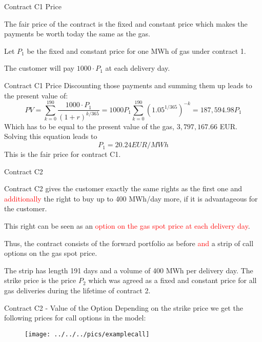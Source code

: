 {Contract C1 Price}






	The fair price of the contract is the fixed and constant price which makes the payments be worth today the same as the gas.


	Let $P_1$ be the fixed and constant price for one MWh of gas under contract 1.


	The customer will pay $1000 \cdot P_1$ at each delivery day.





{Contract C1 Price}
Discounting those payments and summing them up leads to the present value of:
$$
	PV = \sum_{k=0}^{190}{\frac{1000 \cdot P_1}{(1 + r)^{k/365}}} = 1000 P_1 \sum_{k=0}^{190} (1.05^{1/365})^{-k} = 187,594.98 P_1
$$
Which has to be equal to the present value of the gas, $3,797,167.66$ EUR. Solving this equation leads to
$$
	P_1 = 20.24 EUR/MWh
$$
This is the fair price for contract C1.


{Contract C2}






	Contract C2 gives the customer exactly the same rights as the first one and \textcolor{red}{additionally} the right to buy up to 400 MWh/day more, if it is advantageous for the customer.


	This right can be seen as an \textcolor{red}{option on the gas spot price at each delivery day}.


	Thus, the contract consists of the forward portfolio as before \textcolor{red}{and} a strip of call options on the gas spot price.


	The strip has length 191 days and a volume of 400 MWh per delivery day. The strike price is the price $P_2$ which was agreed as a fixed and constant price for all gas deliveries during the lifetime of contract 2.





{Contract C2 - Value of the Option}
Depending on the strike price we get the following prices for call options in the model:
\begin{figure}
	\centering
		\texttt{[image: ../../../pics/examplecall]}
	\label{fig:examplecall}
\end{figure}

